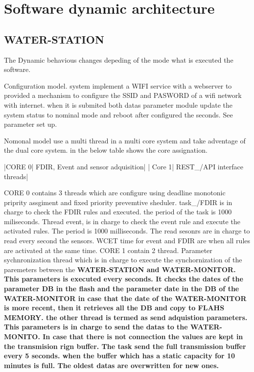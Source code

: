 \section {Software dynamic architecture}
\subsection{WATER-STATION}
The Dynamic behavious changes depeding of the mode what is executed the software.

Configuration model. system implement a WIFI service with a webserver to provided a mechanism to configure the SSID and PASWORD of a wifi network with internet. when it is submited both datas parameter module update the system status to nominal mode and reboot after configured the seconds. See parameter set up.

Nomonal model use a multi thread in a multi core system and take adventage of the dual core system. in the below table shows the core assignation.

|CORE 0| FDIR, Event and sensor adquisition|
| Core 1| REST_/API interface threads|


CORE 0 contains 3 threads which are configure using deadline monotonic priprity assgiment and fixed priority prevemtive sheduler. task_/FDIR is in charge to check the FDIR rules and executed. the period of the task is 1000 miliseconds. Thread event, is in charge to check the event rule and execute the activated rules. The period is 1000 milliseconds. The read sesonrs are in charge to read every second the sensors. WCET time for event and FDIR are when all rules are activated at the same time.
CORE 1 contain 2 thread. Parameter sychnronization thread which  is in  charge to execute the synchornization of the paremeters between the \bf{WATER-STATION} and \bf{WATER-MONITOR}. This parameters is executed every seconds. It checks the dates of the parameter DB in the flash and the parameter date in the DB of the \bf{WATER-MONITOR} in case that the date of the \bf{WATER-MONITOR} is more recent, then it retrieves all the DB and copy to FLAHS MEMORY. the other thread is termed as send adquistion parameters. This parameters is in charge to send the datas to the \bf{WATER-MONITO}. In case that there is not connection the values are kept in the transmision rign buffer. The task send the full transmission buffer every 5 seconds. when the buffer which has a static capacity for 10 minutes is full. The oldest datas are overwritten for new ones.



